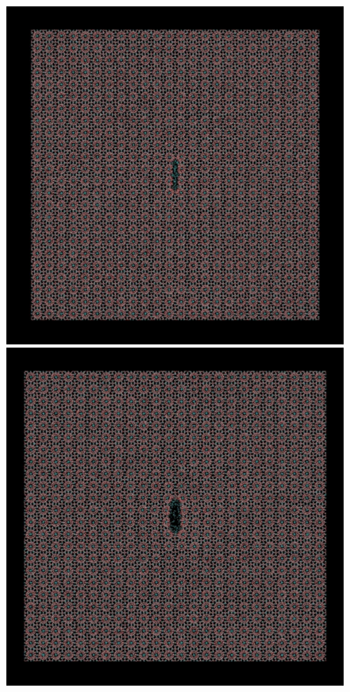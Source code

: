 \begin{figure}
\begin{minipage}[b]{0.5\linewidth}
\includegraphics[width=\textwidth]{../snapshots/c_1.pdf}
\end{minipage}
\begin{minipage}[b]{0.5\linewidth}
\includegraphics[width=\textwidth]{../snapshots/c_2.pdf}

\end{minipage}
\end{figure}
